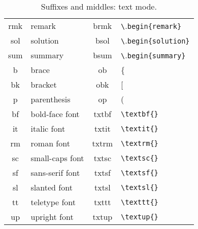 \documentclass[11pt]{article}
\begin{document}
\begin{table}[htb]
\begin{center}
\begin{tabular}{>{\ttfamily}cl>{\ttfamily}c>{\ttfamily}l}
    rmk & remark    & brmk{} & \verb.\.\verb.begin{remark}. \\
    sol & solution  & bsol{} & \verb.\.\verb.begin{solution}. \\
    sum & summary   & bsum{} & \verb.\.\verb.begin{summary}. \\
    b   & brace{}         & ob{}    & \{ \\
    bk  & bracket         & obk{}   & [ \\
    p   & parenthesis     & op{}    & ( \\
    bf  & bold-face font  & txtbf{} & \verb.\textbf{}. \\
    it  & italic font     & txtit{} & \verb.\textit{}. \\
    rm  & roman font      & txtrm{} & \verb.\textrm{}. \\
    sc  & small-caps font & txtsc{} & \verb.\textsc{}. \\
    sf  & sans-serif font & txtsf{} & \verb.\textsf{}. \\
    sl  & slanted font    & txtsl{} & \verb.\textsl{}. \\
    tt  & teletype font   & txttt{} & \verb.\texttt{}. \\
    up  & upright font    & txtup{} & \verb.\textup{}. \\
    \bottomrule
    \end{tabular}
  \end{center}
  \caption{Suffixes and middles: text mode.}
  \label{tb:sufftext}
  \end{table}

\end{document}
